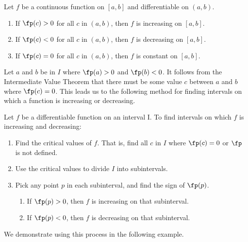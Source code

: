 %
{Let $f$ be a continuous function on $[a,b]$ and differentiable on $(a,b)$.
\begin{enumerate}
\item		If $\fp(c) > 0$ for all $c$ in $(a,b)$, then $f$ is increasing on $[a,b]$.
\item		If $\fp(c) <0$ for all $c$ in $(a,b)$, then $f$ is decreasing on $[a,b]$.
\item		If $\fp(c) =0$ for all $c$ in $(a,b)$, then $f$ is constant on $[a,b]$.
\end{enumerate}
}


Let $a$ and $b$ be in $I$ where $\fp(a)>0$ and $\fp(b)<0$. It follows from the Intermediate Value Theorem that there must be some value $c$ between $a$ and $b$ where $\fp(c) = 0$. This leads us to the following method for finding intervals on which a function is increasing or decreasing.

{Let $f$ be a differentiable function on an interval I. To find intervals on which $f$ is increasing and decreasing:
\begin{enumerate}
\item	Find the critical values of $f$. That is, find all $c$ in $I$ where $\fp(c) = 0$ or $\fp$ is not defined.
\item		Use the critical values to divide $I$ into subintervals.
\item		Pick any point $p$ in each subinterval, and find the sign of $\fp(p)$. 
		\begin{enumerate}
		\item		If $\fp(p)>0$, then $f$ is increasing on that subinterval.
		\item		If $\fp(p)<0$, then $f$ is decreasing on that subinterval.
		\end{enumerate}
\end{enumerate}
}

We demonstrate using this process in the following example.\\

